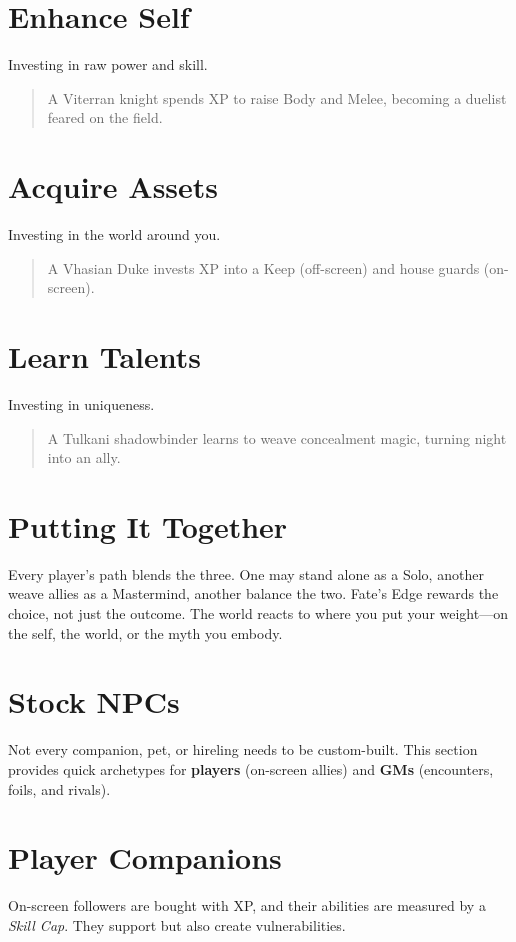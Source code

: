 \documentclass[11pt]{article}
\begin{document}
\section{Enhance Self}
Investing in raw power and skill.  
\begin{quote}
A Viterran knight spends XP to raise Body and Melee, becoming a duelist feared on the field.  
\end{quote}

\section{Acquire Assets}
Investing in the world around you.  
\begin{quote}
A Vhasian Duke invests XP into a Keep (off-screen) and house guards (on-screen).  
\end{quote}

\section{Learn Talents}
Investing in uniqueness.  
\begin{quote}
A Tulkani shadowbinder learns to weave concealment magic, turning night into an ally.  
\end{quote}

\section{Putting It Together}
Every player’s path blends the three. One may stand alone as a Solo, another weave allies as a Mastermind, another balance the two.  
Fate’s Edge rewards the choice, not just the outcome.  
The world reacts to where you put your weight—on the self, the world, or the myth you embody.

\section{Stock NPCs}

Not every companion, pet, or hireling needs to be custom-built.  
This section provides quick archetypes for \textbf{players} (on-screen allies) and \textbf{GMs} (encounters, foils, and rivals).

\section{Player Companions}
On-screen followers are bought with XP, and their abilities are measured by a \emph{Skill Cap}. They support but also create vulnerabilities.  
\end{document}

